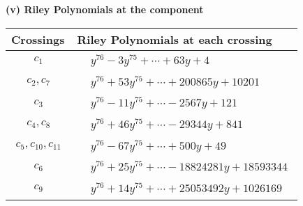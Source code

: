 \documentclass[1p]{elsarticle_modified}
\theoremstyle{definition}
\begin{document}
\flushleft \textbf{(v) Riley Polynomials at the component}\newline \\
\begin{tabular}{m{50pt}|m{274pt}}
Crossings & \hspace{64pt}Riley Polynomials at each crossing \\
\hline $$\begin{aligned}c_{1}\end{aligned}$$&$\begin{aligned}
&y^{76}-3 y^{75}+\cdots+63 y+4
\end{aligned}$\\
\hline $$\begin{aligned}c_{2},c_{7}\end{aligned}$$&$\begin{aligned}
&y^{76}+53 y^{75}+\cdots+200865 y+10201
\end{aligned}$\\
\hline $$\begin{aligned}c_{3}\end{aligned}$$&$\begin{aligned}
&y^{76}-11 y^{75}+\cdots-2567 y+121
\end{aligned}$\\
\hline $$\begin{aligned}c_{4},c_{8}\end{aligned}$$&$\begin{aligned}
&y^{76}+46 y^{75}+\cdots-29344 y+841
\end{aligned}$\\
\hline $$\begin{aligned}c_{5},c_{10},c_{11}\end{aligned}$$&$\begin{aligned}
&y^{76}-67 y^{75}+\cdots+500 y+49
\end{aligned}$\\
\hline $$\begin{aligned}c_{6}\end{aligned}$$&$\begin{aligned}
&y^{76}+25 y^{75}+\cdots-18824281 y+18593344
\end{aligned}$\\
\hline $$\begin{aligned}c_{9}\end{aligned}$$&$\begin{aligned}
&y^{76}+14 y^{75}+\cdots+25053492 y+1026169
\end{aligned}$\\
\hline
\end{tabular}\\~\\
\end{document}
